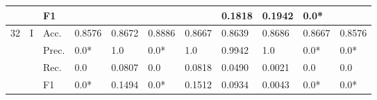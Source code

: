 \begin{tabular}{cclllllllll}
    \multicolumn{1}{l}{}                                                                                       &                                   & F1                                                   &                         &                         &                              &                         & 0.1818                                                                       & 0.1942                                                                      & 0.0*                                      &                                           \\ 
    \midrule
    \multirow{12}{*}{32}                                                                                       & \multirow{4}{*}{I}                & Acc.                                                 & 0.8576                  & 0.8672                  & 0.8886                       & 0.8667                  & 0.8639                                                                       & 0.8686                                                                      & 0.8667                                    & 0.8576                                    \\
                                                                                                               &                                   & Prec.                                                & 0.0*                    & 1.0                     & 0.0*                         & 1.0                     & 0.9942                                                                       & 1.0                                                                         & 0.0*                                      & 0.0*                                      \\
                                                                                                               &                                   & Rec.                                                 & 0.0                     & 0.0807                  & 0.0                          & 0.0818                  & 0.0490                                                                       & 0.0021                                                                      & 0.0                                       & 0.0                                       \\
                                                                                                               &                                   & F1                                                   & 0.0*                    & 0.1494                  & 0.0*                         & 0.1512                  & 0.0934                                                                       & 0.0043                                                                      & 0.0*                                      & 0.0*                                      \\ 

\end{tabular}
